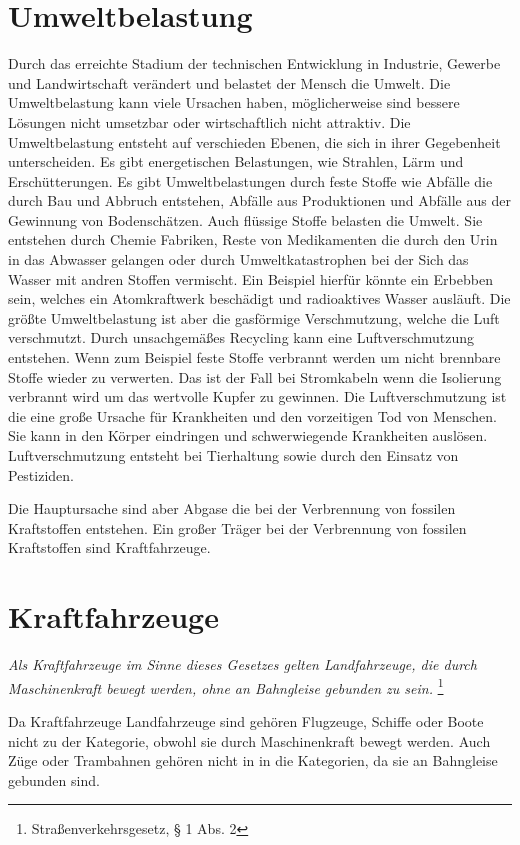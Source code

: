 \chapter{Umweltbelastung}
Durch das erreichte Stadium der technischen Entwicklung in Industrie, Gewerbe und Landwirtschaft verändert und belastet der Mensch die Umwelt.
Die Umweltbelastung kann viele Ursachen haben, möglicherweise sind bessere Lösungen nicht umsetzbar oder wirtschaftlich nicht attraktiv.
Die Umweltbelastung entsteht auf verschieden Ebenen, die sich in ihrer Gegebenheit unterscheiden.
Es gibt energetischen Belastungen, wie Strahlen, Lärm und Erschütterungen.
Es gibt Umweltbelastungen durch feste Stoffe wie Abfälle die durch Bau und Abbruch entstehen, Abfälle aus Produktionen und Abfälle aus der Gewinnung von Bodenschätzen.
Auch flüssige Stoffe belasten die Umwelt. Sie entstehen durch Chemie Fabriken, Reste von Medikamenten die durch den Urin in das Abwasser gelangen oder durch Umweltkatastrophen bei der Sich das Wasser mit andren Stoffen vermischt.
Ein Beispiel hierfür könnte ein Erbebben sein, welches ein Atomkraftwerk beschädigt und radioaktives Wasser ausläuft.
Die größte Umweltbelastung ist aber die gasförmige Verschmutzung, welche die Luft verschmutzt.
Durch unsachgemäßes Recycling kann eine Luftverschmutzung entstehen.
Wenn zum Beispiel feste Stoffe verbrannt werden um nicht brennbare Stoffe wieder zu verwerten.
Das ist der Fall bei Stromkabeln wenn die Isolierung verbrannt wird um das wertvolle Kupfer zu gewinnen.
Die Luftverschmutzung ist die eine große Ursache für Krankheiten und den vorzeitigen Tod von Menschen.
Sie kann in den Körper eindringen und schwerwiegende Krankheiten auslösen.
Luftverschmutzung entsteht bei Tierhaltung sowie durch den Einsatz von Pestiziden. 

Die Hauptursache sind aber Abgase die bei der Verbrennung von fossilen Kraftstoffen entstehen. 
Ein großer Träger bei der Verbrennung von fossilen Kraftstoffen sind Kraftfahrzeuge.

\chapter{Kraftfahrzeuge}
\textit{Als Kraftfahrzeuge im Sinne dieses Gesetzes gelten Landfahrzeuge, die durch Maschinenkraft bewegt werden, ohne an Bahngleise gebunden zu sein.}
\footnote{Straßenverkehrsgesetz, § 1 Abs. 2}

Da Kraftfahrzeuge Landfahrzeuge sind gehören Flugzeuge, Schiffe oder Boote nicht zu der Kategorie, obwohl sie durch Maschinenkraft bewegt werden.
Auch Züge oder Trambahnen gehören nicht in in die Kategorien, da sie an Bahngleise gebunden sind.

